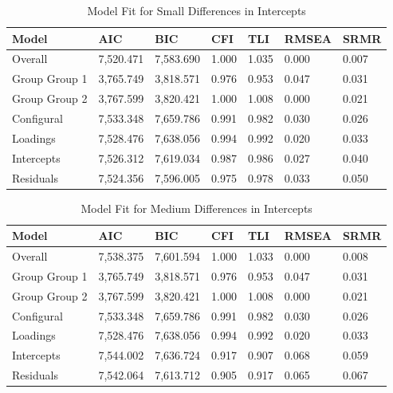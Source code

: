 \documentclass[
  man]{apa7}
\begin{document}
\begin{table}[tbp]

\begin{center}
\begin{threeparttable}

\caption{\label{tab:tab5}Model Fit for Small Differences in Intercepts}

\begin{tabular}{lllllll}
\toprule
Model & AIC & BIC & CFI & TLI & RMSEA & SRMR\\
\midrule
Overall & 7,520.471 & 7,583.690 & 1.000 & 1.035 & 0.000 & 0.007\\
Group Group 1 & 3,765.749 & 3,818.571 & 0.976 & 0.953 & 0.047 & 0.031\\
Group Group 2 & 3,767.599 & 3,820.421 & 1.000 & 1.008 & 0.000 & 0.021\\
Configural & 7,533.348 & 7,659.786 & 0.991 & 0.982 & 0.030 & 0.026\\
Loadings & 7,528.476 & 7,638.056 & 0.994 & 0.992 & 0.020 & 0.033\\
Intercepts & 7,526.312 & 7,619.034 & 0.987 & 0.986 & 0.027 & 0.040\\
Residuals & 7,524.356 & 7,596.005 & 0.975 & 0.978 & 0.033 & 0.050\\
\bottomrule
\end{tabular}

\end{threeparttable}
\end{center}

\end{table}

\begin{table}[tbp]

\begin{center}
\begin{threeparttable}

\caption{\label{tab:tab6}Model Fit for Medium Differences in Intercepts}

\begin{tabular}{lllllll}
\toprule
Model & AIC & BIC & CFI & TLI & RMSEA & SRMR\\
\midrule
Overall & 7,538.375 & 7,601.594 & 1.000 & 1.033 & 0.000 & 0.008\\
Group Group 1 & 3,765.749 & 3,818.571 & 0.976 & 0.953 & 0.047 & 0.031\\
Group Group 2 & 3,767.599 & 3,820.421 & 1.000 & 1.008 & 0.000 & 0.021\\
Configural & 7,533.348 & 7,659.786 & 0.991 & 0.982 & 0.030 & 0.026\\
Loadings & 7,528.476 & 7,638.056 & 0.994 & 0.992 & 0.020 & 0.033\\
Intercepts & 7,544.002 & 7,636.724 & 0.917 & 0.907 & 0.068 & 0.059\\
Residuals & 7,542.064 & 7,613.712 & 0.905 & 0.917 & 0.065 & 0.067\\
\bottomrule
\end{tabular}

\end{threeparttable}
\end{center}

\end{table}
\end{document}
